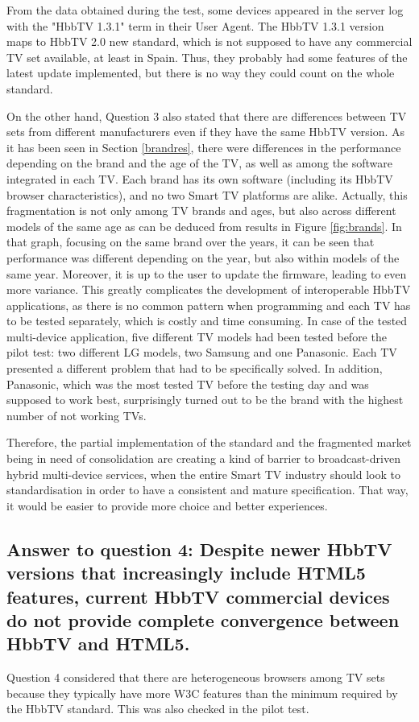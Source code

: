 From the data obtained during the test, some devices appeared in the server log with the "HbbTV 1.3.1" term in their User Agent. The HbbTV 1.3.1 version maps to HbbTV 2.0 new standard, which is not supposed to have any commercial TV set available, at least in Spain. Thus, they probably had some features of the latest update implemented, but there is no way they could count on the whole standard.

On the other hand, Question 3 also stated that there are differences between TV sets from different manufacturers even if they have the same HbbTV version. As it has been seen in Section \ref{brandres}, there were differences in the performance depending on the brand and the age of the TV, as well as among the software integrated in each TV. Each brand has its own software (including its HbbTV browser characteristics), and no two Smart TV platforms are alike. Actually, this fragmentation is not only among TV brands and ages, but also across different models of the same age as can be deduced from results in Figure \ref{fig:brands}. In that graph, focusing on the same brand over the years, it can be seen that performance was different depending on the year, but also within models of the same year. Moreover, it is up to the user to update the firmware, leading to even more variance. This greatly complicates the development of interoperable HbbTV applications, as there is no common pattern when programming and each TV has to be tested separately, which is costly and time consuming. In case of the tested multi-device application, five different TV models had been tested before the pilot test: two different LG models, two Samsung and one Panasonic. Each TV presented a different problem that had to be specifically solved. In addition, Panasonic, which was the most tested TV before the testing day and was supposed to work best, surprisingly turned out to be the brand with the highest number of not working TVs.

Therefore, the partial implementation of the standard and the fragmented market being in need of consolidation are creating a kind of barrier to broadcast-driven hybrid multi-device services, when the entire Smart TV industry should look to standardisation in order to have a consistent and mature specification. That way, it would be easier to provide more choice and better experiences.


\subsection{Answer to question 4: Despite newer HbbTV versions that increasingly include HTML5 features, current HbbTV commercial devices do not provide complete convergence between HbbTV and HTML5.}
Question 4 considered that there are heterogeneous browsers among TV sets because they typically have more W3C features than the minimum required by the HbbTV standard. This was also checked in the pilot test.  

